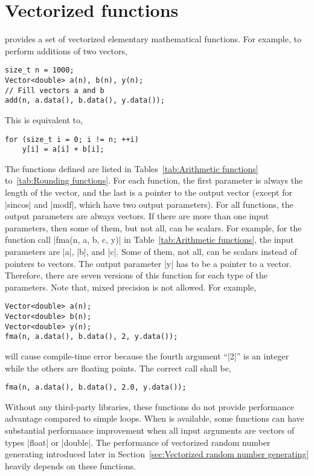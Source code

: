 \section{Vectorized functions}
\label{sec:Vectorized functions}

\mckl provides a set of vectorized elementary mathematical functions. For
example, to perform additions of two vectors,
\begin{Verbatim}
size_t n = 1000;
Vector<double> a(n), b(n), y(n);
// Fill vectors a and b
add(n, a.data(), b.data(), y.data());
\end{Verbatim}
This is equivalent to,
\begin{Verbatim}
for (size_t i = 0; i != n; ++i)
    y[i] = a[i] + b[i];
\end{Verbatim}
The functions defined are listed in Tables~\ref{tab:Arithmetic functions}
to~\ref{tab:Rounding functions}. For each function, the first parameter is
always the length of the vector, and the last is a pointer to the output vector
(except for |sincos| and |modf|, which have two output parameters). For all
functions, the output parameters are always vectors. If there are more than one
input parameters, then some of them, but not all, can be scalars. For example,
for the function call |fma(n, a, b, c, y)| in Table~\ref{tab:Arithmetic
functions}, the input parameters are |a|, |b|, and |c|. Some of them, not all,
can be scalars instead of pointers to vectors. The output parameter |y| has to
be a pointer to a vector. Therefore, there are seven versions of this function
for each type of the parameters. Note that, mixed precision is not allowed. For
example,
\begin{Verbatim}
Vector<double> a(n);
Vector<double> b(n);
Vector<double> y(n);
fma(n, a.data(), b.data(), 2, y.data());
\end{Verbatim}
will cause compile-time error because the fourth argument ``|2|'' is an integer
while the others are floating points. The correct call shall be,
\begin{Verbatim}
fma(n, a.data(), b.data(), 2.0, y.data());
\end{Verbatim}
Without any third-party libraries, these functions do not provide performance
advantage compared to simple loops. When \mkl is available, some functions can
have substantial performance improvement when all input arguments are vectors
of types |float| or |double|. The performance of vectorized random number
generating introduced later in Section~\ref{sec:Vectorized random number
generating} heavily depends on these functions.

